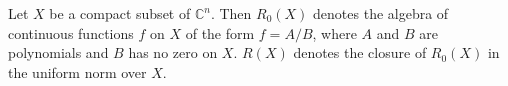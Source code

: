 
Let $X$ be a compact subset of $\mathbb{C}^n$. Then $R_0(X)$ denotes the algebra of continuous functions $f$ on $X$ of the form $f = A/B$, where $A$ and $B$ are polynomials and $B$ has no zero on $X$. $R(X)$ denotes the closure of $R_0(X)$ in the uniform norm over $X$.
